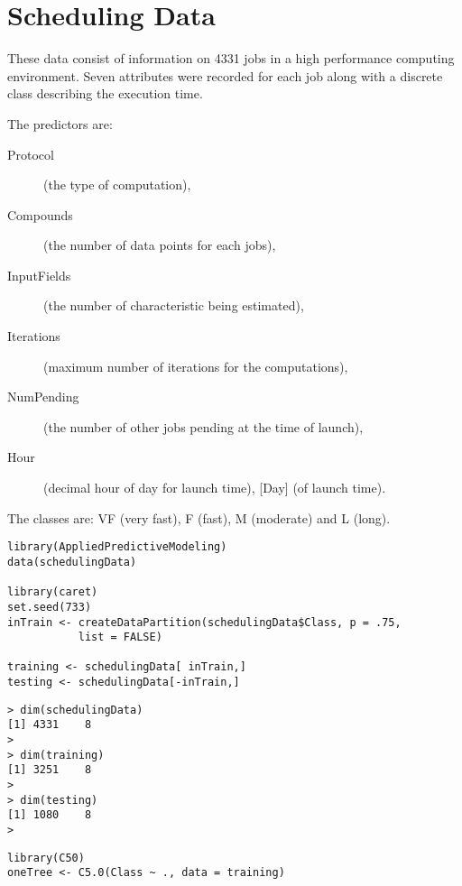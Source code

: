 \documentclass[caret-main.tex]{subfiles}
\begin{document}

\section{Scheduling Data}

These data consist of information on 4331 jobs in a high performance computing environment. Seven attributes were recorded for each job along with a discrete class describing the execution time.

\noindent The predictors are:
\begin{description}
\item[Protocol] (the type of computation), \item[Compounds] (the number of data points for each jobs), \item[InputFields] (the number of characteristic being estimated), \item[Iterations] (maximum number of iterations for the computations), \item[NumPending] (the number of other jobs pending at the time of launch), \item[Hour] (decimal hour of day for launch time), [Day] (of launch time).
\end{description} 

The classes are: VF (very fast), F (fast), M (moderate) and L (long).
\newpage
\begin{framed}
\begin{verbatim}
library(AppliedPredictiveModeling)
data(schedulingData)

library(caret)
set.seed(733)
inTrain <- createDataPartition(schedulingData$Class, p = .75, 
		   list = FALSE)
		   
training <- schedulingData[ inTrain,]
testing <- schedulingData[-inTrain,]
\end{verbatim}
\end{framed}

\begin{verbatim}
> dim(schedulingData)
[1] 4331    8
>
> dim(training)
[1] 3251    8
>
> dim(testing)
[1] 1080    8
> 
\end{verbatim}


\newpage
\begin{framed}
\begin{verbatim}
library(C50)
oneTree <- C5.0(Class ~ ., data = training)
\end{verbatim}
\end{framed}
\end{document}
